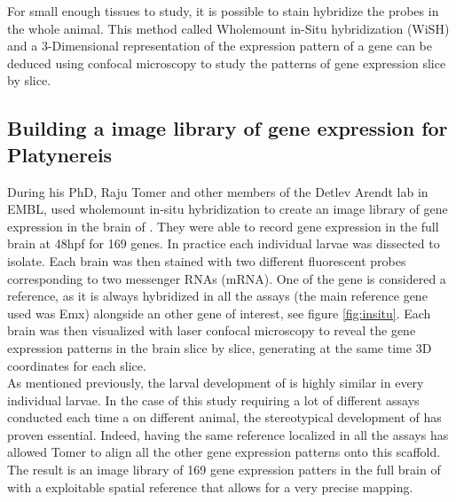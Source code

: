      For small enough tissues to study, it is possible to stain hybridize the probes in the whole animal. This method called Wholemount in-Situ hybridization (WiSH) and a 3-Dimensional representation of the expression pattern of a gene can be deduced using confocal microscopy to study the patterns of gene expression slice by slice.
     

     \subsection{Building a image library of gene expression for Platynereis}
     During his PhD, Raju Tomer and other  members of the Detlev Arendt lab in EMBL, used wholemount in-situ hybridization to create an image library of gene expression in the brain of \platy{}. They were able to record gene expression in the full brain at 48hpf for 169 genes. In practice each individual larvae was dissected to isolate. Each brain was then stained with two different fluorescent probes corresponding to two messenger RNAs (mRNA). One of the gene is considered a reference, as it is always hybridized in all the assays (the main reference gene used was Emx) alongside an other gene of interest, see figure \ref{fig:insitu}. Each brain was then visualized with laser confocal microscopy to reveal the gene expression patterns in the brain slice by slice, generating at the same time 3D coordinates for each slice.\\
     
     As mentioned previously, the larval development of \platy{} is highly similar in every individual larvae. In the case of this study requiring a lot of different assays conducted each time a on different animal, the stereotypical development of \platy{} has proven essential. Indeed, having the same reference localized in all the assays has allowed Tomer to align all the other gene expression patterns onto this scaffold. The result is an image library of 169 gene expression patters in the full brain of \platy{} with a exploitable spatial reference that allows for a very precise mapping.\\
    
